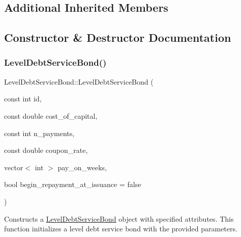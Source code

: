 \subsection*{Additional Inherited Members}


\subsection{Constructor \& Destructor Documentation}
\mbox{\label{classLevelDebtServiceBond_a71af87d057090bd2310a10df03b36fdf}} 
\subsubsection{\texorpdfstring{Level\+Debt\+Service\+Bond()}{LevelDebtServiceBond()}}
{\footnotesize\ttfamily Level\+Debt\+Service\+Bond\+::\+Level\+Debt\+Service\+Bond (\begin{DoxyParamCaption}\item[{const int}]{id,  }\item[{const double}]{cost\+\_\+of\+\_\+capital,  }\item[{const int}]{n\+\_\+payments,  }\item[{const double}]{coupon\+\_\+rate,  }\item[{vector$<$ int $>$}]{pay\+\_\+on\+\_\+weeks,  }\item[{bool}]{begin\+\_\+repayment\+\_\+at\+\_\+issuance = {\ttfamily false} }\end{DoxyParamCaption})}



Constructs a \mbox{\hyperlink{classLevelDebtServiceBond}{Level\+Debt\+Service\+Bond}} object with specified attributes. This function initializes a level debt service bond with the provided parameters. 


